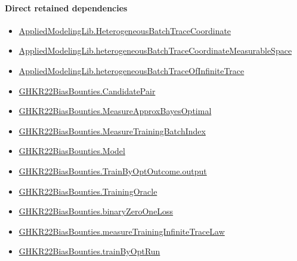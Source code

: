 \documentclass[10pt]{article}
\begin{document}
\paragraph{Direct retained dependencies}
\begin{itemize}\raggedright
\item \hyperlink{governing-declaration-37d7ae049de215a7}{Applied\allowbreak{}Modeling\allowbreak{}Lib.\allowbreak{}Heterogeneous\allowbreak{}Batch\allowbreak{}Trace\allowbreak{}Coordinate}
\item \hyperlink{governing-declaration-92d1582063c434f3}{Applied\allowbreak{}Modeling\allowbreak{}Lib.\allowbreak{}heterogeneous\allowbreak{}Batch\allowbreak{}Trace\allowbreak{}Coordinate\allowbreak{}Measurable\allowbreak{}Space}
\item \hyperlink{governing-declaration-644c195e65179f85}{Applied\allowbreak{}Modeling\allowbreak{}Lib.\allowbreak{}heterogeneous\allowbreak{}Batch\allowbreak{}Trace\allowbreak{}Of\allowbreak{}Infinite\allowbreak{}Trace}
\item \hyperlink{governing-declaration-373b79d2a57e81fc}{GHKR22\allowbreak{}Bias\allowbreak{}Bounties.\allowbreak{}Candidate\allowbreak{}Pair}
\item \hyperlink{paper-prerequisite-7ae84fcf376c9f20}{GHKR22\allowbreak{}Bias\allowbreak{}Bounties.\allowbreak{}Measure\allowbreak{}Approx\allowbreak{}Bayes\allowbreak{}Optimal}
\item \hyperlink{governing-declaration-dc25f678adad672d}{GHKR22\allowbreak{}Bias\allowbreak{}Bounties.\allowbreak{}Measure\allowbreak{}Training\allowbreak{}Batch\allowbreak{}Index}
\item \hyperlink{paper-prerequisite-333127605c12eba8}{GHKR22\allowbreak{}Bias\allowbreak{}Bounties.\allowbreak{}Model}
\item \hyperlink{governing-declaration-6431050811413d1c}{GHKR22\allowbreak{}Bias\allowbreak{}Bounties.\allowbreak{}Train\allowbreak{}By\allowbreak{}Opt\allowbreak{}Outcome.\allowbreak{}output}
\item \hyperlink{governing-declaration-e07f2849e71306e6}{GHKR22\allowbreak{}Bias\allowbreak{}Bounties.\allowbreak{}Training\allowbreak{}Oracle}
\item \hyperlink{governing-declaration-78e8cb53fdc44c21}{GHKR22\allowbreak{}Bias\allowbreak{}Bounties.\allowbreak{}binary\allowbreak{}Zero\allowbreak{}One\allowbreak{}Loss}
\item \hyperlink{governing-declaration-51faa5483ff0d2f8}{GHKR22\allowbreak{}Bias\allowbreak{}Bounties.\allowbreak{}measure\allowbreak{}Training\allowbreak{}Infinite\allowbreak{}Trace\allowbreak{}Law}
\item \hyperlink{paper-prerequisite-07b48266bf86505a}{GHKR22\allowbreak{}Bias\allowbreak{}Bounties.\allowbreak{}train\allowbreak{}By\allowbreak{}Opt\allowbreak{}Run}
\end{itemize}
\hypertarget{governing-declaration-540e3de2d3eb3da3}{}
\end{document}
